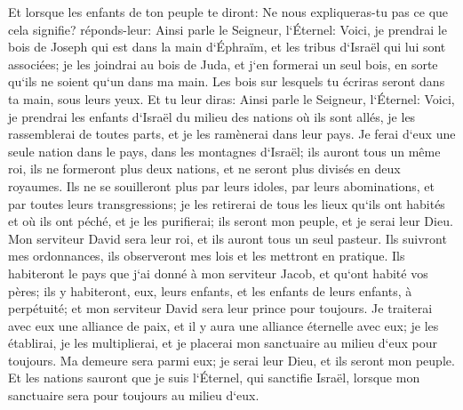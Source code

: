 \verse Et lorsque les enfants de ton peuple te diront: Ne nous expliqueras-tu pas ce que cela signifie? 
\verse réponds-leur: Ainsi parle le Seigneur, l`Éternel: Voici, je prendrai le bois de Joseph qui est dans la main d`Éphraïm, et les tribus d`Israël qui lui sont associées; je les joindrai au bois de Juda, et j`en formerai un seul bois, en sorte qu`ils ne soient qu`un dans ma main. 
\verse Les bois sur lesquels tu écriras seront dans ta main, sous leurs yeux. 
\verse Et tu leur diras: Ainsi parle le Seigneur, l`Éternel: Voici, je prendrai les enfants d`Israël du milieu des nations où ils sont allés, je les rassemblerai de toutes parts, et je les ramènerai dans leur pays. 
\verse Je ferai d`eux une seule nation dans le pays, dans les montagnes d`Israël; ils auront tous un même roi, ils ne formeront plus deux nations, et ne seront plus divisés en deux royaumes. 
\verse Ils ne se souilleront plus par leurs idoles, par leurs abominations, et par toutes leurs transgressions; je les retirerai de tous les lieux qu`ils ont habités et où ils ont péché, et je les purifierai; ils seront mon peuple, et je serai leur Dieu. 
\verse Mon serviteur David sera leur roi, et ils auront tous un seul pasteur. Ils suivront mes ordonnances, ils observeront mes lois et les mettront en pratique. 
\verse Ils habiteront le pays que j`ai donné à mon serviteur Jacob, et qu`ont habité vos pères; ils y habiteront, eux, leurs enfants, et les enfants de leurs enfants, à perpétuité; et mon serviteur David sera leur prince pour toujours. 
\verse Je traiterai avec eux une alliance de paix, et il y aura une alliance éternelle avec eux; je les établirai, je les multiplierai, et je placerai mon sanctuaire au milieu d`eux pour toujours. 
\verse Ma demeure sera parmi eux; je serai leur Dieu, et ils seront mon peuple. 
\verse Et les nations sauront que je suis l`Éternel, qui sanctifie Israël, lorsque mon sanctuaire sera pour toujours au milieu d`eux. 

\chapter{}

